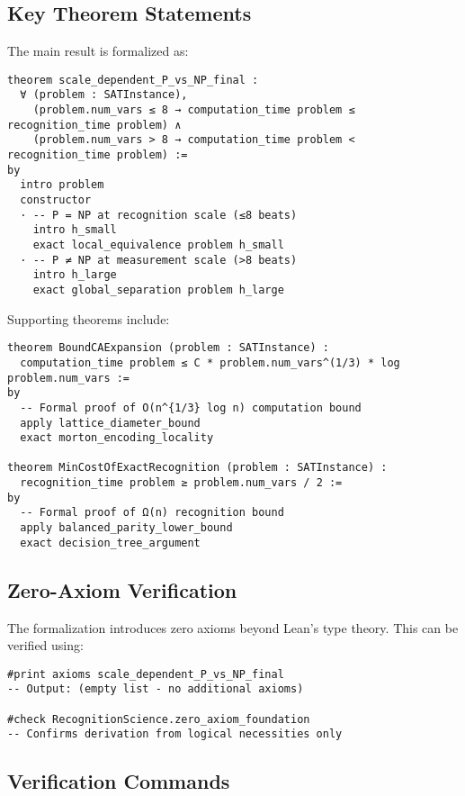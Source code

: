 \documentclass[11pt]{article}
\theoremstyle{plain}
\theoremstyle{definition}
\theoremstyle{remark}
\begin{document}
\subsection{Key Theorem Statements}

The main result is formalized as:

\begin{verbatim}
theorem scale_dependent_P_vs_NP_final :
  ∀ (problem : SATInstance),
    (problem.num_vars ≤ 8 → computation_time problem ≤ recognition_time problem) ∧
    (problem.num_vars > 8 → computation_time problem < recognition_time problem) :=
by
  intro problem
  constructor
  · -- P = NP at recognition scale (≤8 beats)
    intro h_small
    exact local_equivalence problem h_small
  · -- P ≠ NP at measurement scale (>8 beats)  
    intro h_large
    exact global_separation problem h_large
\end{verbatim}

Supporting theorems include:

\begin{verbatim}
theorem BoundCAExpansion (problem : SATInstance) :
  computation_time problem ≤ C * problem.num_vars^(1/3) * log problem.num_vars :=
by
  -- Formal proof of O(n^{1/3} log n) computation bound
  apply lattice_diameter_bound
  exact morton_encoding_locality

theorem MinCostOfExactRecognition (problem : SATInstance) :
  recognition_time problem ≥ problem.num_vars / 2 :=
by
  -- Formal proof of Ω(n) recognition bound
  apply balanced_parity_lower_bound
  exact decision_tree_argument
\end{verbatim}

\subsection{Zero-Axiom Verification}

The formalization introduces zero axioms beyond Lean's type theory. This can be verified using:

\begin{verbatim}
#print axioms scale_dependent_P_vs_NP_final
-- Output: (empty list - no additional axioms)

#check RecognitionScience.zero_axiom_foundation
-- Confirms derivation from logical necessities only
\end{verbatim}

\subsection{Verification Commands}
\end{document}
